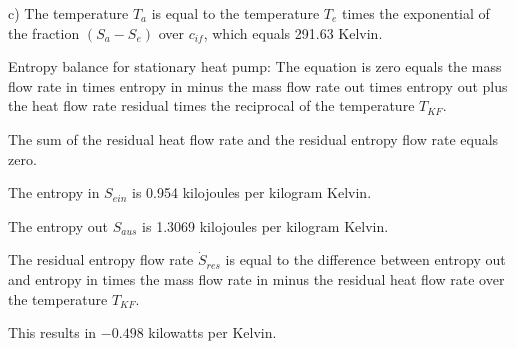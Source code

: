 c) The temperature \( T_a \) is equal to the temperature \( T_e \) times the exponential of the fraction \((S_a - S_e)\) over \(c_{if}\), which equals 291.63 Kelvin.

Entropy balance for stationary heat pump:
The equation is zero equals the mass flow rate in times entropy in minus the mass flow rate out times entropy out plus the heat flow rate residual times the reciprocal of the temperature \(T_{KF}\).

The sum of the residual heat flow rate and the residual entropy flow rate equals zero.

The entropy in \( S_{ein} \) is 0.954 kilojoules per kilogram Kelvin.

The entropy out \( S_{aus} \) is 1.3069 kilojoules per kilogram Kelvin.

The residual entropy flow rate \( \dot{S}_{res} \) is equal to the difference between entropy out and entropy in times the mass flow rate in minus the residual heat flow rate over the temperature \(T_{KF}\).

This results in \(-0.498\) kilowatts per Kelvin.